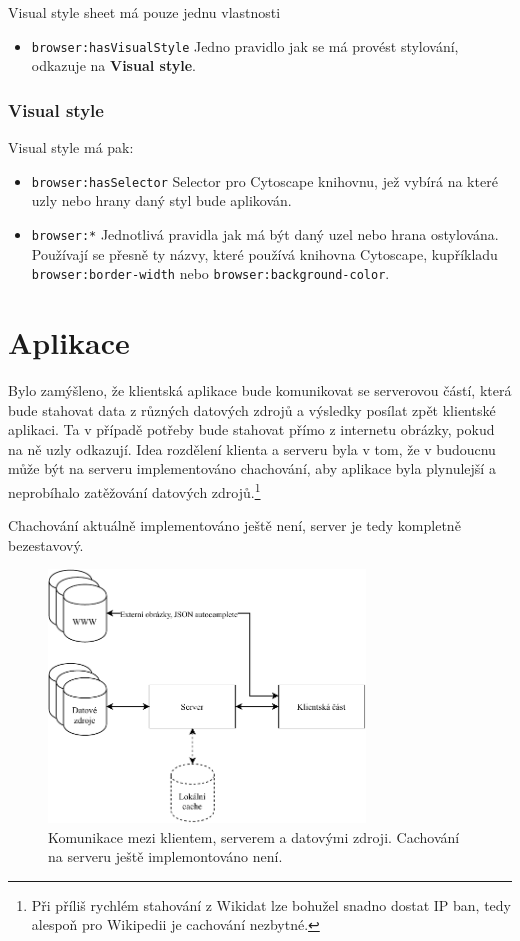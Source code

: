 Visual style sheet má pouze jednu vlastnosti

\begin{itemize}
    \item \texttt{browser:hasVisualStyle} Jedno pravidlo jak se má provést stylování, odkazuje na \textbf{Visual style}.
\end{itemize}

\subsubsection{Visual style}
Visual style má pak:

\begin{itemize}
    \item \texttt{browser:hasSelector} Selector pro Cytoscape knihovnu, jež vybírá na které uzly nebo hrany daný styl bude aplikován.
    \item \texttt{browser:*} Jednotlivá pravidla jak má být daný uzel nebo hrana ostylována. Používají se přesně ty názvy, které používá knihovna Cytoscape, kupříkladu \texttt{browser:border-width} nebo \texttt{browser:background-color}.
\end{itemize}

\section{Aplikace}

Bylo zamýšleno, že klientská aplikace bude komunikovat se serverovou částí, která bude stahovat data z různých datových zdrojů a výsledky posílat zpět klientské aplikaci. Ta v případě potřeby bude stahovat přímo z internetu obrázky, pokud na ně uzly odkazují. Idea rozdělení klienta a serveru byla v tom, že v budoucnu může být na serveru implementováno chachování, aby aplikace byla plynulejší a neprobíhalo zatěžování datových zdrojů.\footnote{Při příliš rychlém stahování z Wikidat lze bohužel snadno dostat IP ban, tedy alespoň pro Wikipedii je cachování nezbytné.}

Chachování aktuálně implementováno ještě není, server je tedy kompletně bezestavový.

\begin{figure}[h]
    \centering
    \includegraphics[width=0.75\textwidth]{media/communication.pdf}
    \caption{Komunikace mezi klientem, serverem a datovými zdroji. Cachování na serveru ještě implemontováno není.}
\end{figure}

